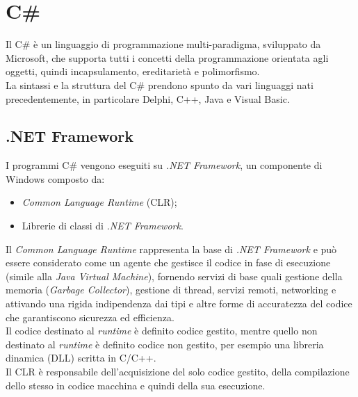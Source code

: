 \section{C\#}
Il C\#\cite{CSharp} è un linguaggio di programmazione multi-paradigma, sviluppato da Microsoft, che supporta tutti i concetti della programmazione orientata agli oggetti, quindi incapsulamento, ereditarietà e polimorfismo.\\La sintassi e la struttura del C\# prendono spunto da vari linguaggi nati precedentemente, in particolare Delphi, C++, Java e Visual Basic.
\subsection{.NET Framework}
I programmi C\# vengono eseguiti su \textit{.NET Framework}\cite{CSharp}, un componente di Windows composto da:
\begin{itemize}
    \item \textit{Common Language Runtime} (CLR);
    \item Librerie di classi di \textit{.NET Framework}.
\end{itemize}
Il \textit{Common Language Runtime} rappresenta la base di \textit{.NET Framework} e può essere considerato come un agente che gestisce il codice in fase di esecuzione (simile alla \textit{Java Virtual Machine}), fornendo servizi di base quali gestione della memoria (\textit{Garbage Collector}), gestione di thread, servizi remoti, networking e attivando una rigida indipendenza dai tipi e altre forme di accuratezza del codice che garantiscono sicurezza ed efficienza.\\Il codice destinato al \textit{runtime} è definito codice gestito, mentre quello non destinato al \textit{runtime} è definito codice non gestito, per esempio una libreria dinamica (DLL) scritta in C/C++.\\Il CLR è responsabile dell'acquisizione del solo codice gestito, della compilazione dello stesso in codice macchina e quindi della sua esecuzione.
